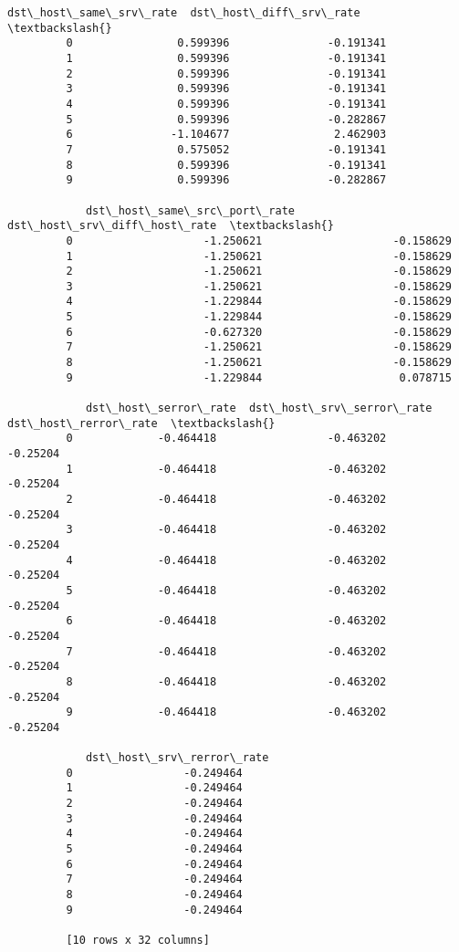 \documentclass[11pt]{article}
\begin{document}
\begin{Verbatim}[commandchars=\\\{\}]
            dst\_host\_same\_srv\_rate  dst\_host\_diff\_srv\_rate  \textbackslash{}
         0                0.599396               -0.191341   
         1                0.599396               -0.191341   
         2                0.599396               -0.191341   
         3                0.599396               -0.191341   
         4                0.599396               -0.191341   
         5                0.599396               -0.282867   
         6               -1.104677                2.462903   
         7                0.575052               -0.191341   
         8                0.599396               -0.191341   
         9                0.599396               -0.282867   
         
            dst\_host\_same\_src\_port\_rate  dst\_host\_srv\_diff\_host\_rate  \textbackslash{}
         0                    -1.250621                    -0.158629   
         1                    -1.250621                    -0.158629   
         2                    -1.250621                    -0.158629   
         3                    -1.250621                    -0.158629   
         4                    -1.229844                    -0.158629   
         5                    -1.229844                    -0.158629   
         6                    -0.627320                    -0.158629   
         7                    -1.250621                    -0.158629   
         8                    -1.250621                    -0.158629   
         9                    -1.229844                     0.078715   
         
            dst\_host\_serror\_rate  dst\_host\_srv\_serror\_rate  dst\_host\_rerror\_rate  \textbackslash{}
         0             -0.464418                 -0.463202              -0.25204   
         1             -0.464418                 -0.463202              -0.25204   
         2             -0.464418                 -0.463202              -0.25204   
         3             -0.464418                 -0.463202              -0.25204   
         4             -0.464418                 -0.463202              -0.25204   
         5             -0.464418                 -0.463202              -0.25204   
         6             -0.464418                 -0.463202              -0.25204   
         7             -0.464418                 -0.463202              -0.25204   
         8             -0.464418                 -0.463202              -0.25204   
         9             -0.464418                 -0.463202              -0.25204   
         
            dst\_host\_srv\_rerror\_rate  
         0                 -0.249464  
         1                 -0.249464  
         2                 -0.249464  
         3                 -0.249464  
         4                 -0.249464  
         5                 -0.249464  
         6                 -0.249464  
         7                 -0.249464  
         8                 -0.249464  
         9                 -0.249464  
         
         [10 rows x 32 columns]
\end{Verbatim}
            
\end{document}
